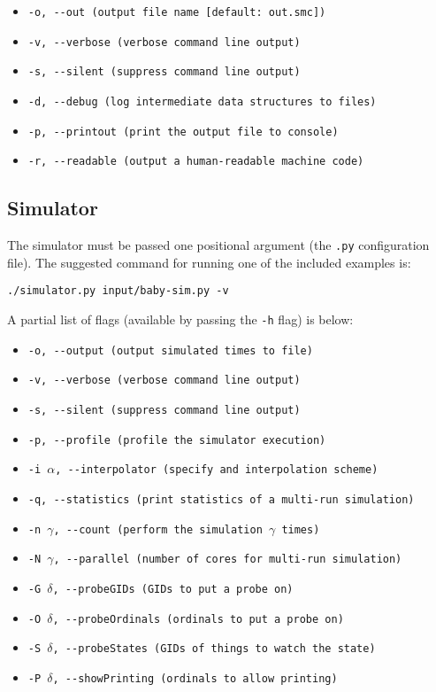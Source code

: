 \documentclass [letterpaper, 10pt, notitlepage, fleqn, oneside, 
  landscape] {article}
\begin{document}
\begin{multicols}{2}
  \begin{itemize}
  \item \texttt{-o, -{}-out (output file name [default: out.smc])}
  \item \texttt{-v, -{}-verbose (verbose command line output)}
  \item \texttt{-s, -{}-silent (suppress command line output)}
  \item \texttt{-d, -{}-debug (log intermediate data structures to files)}
  \item \texttt{-p, -{}-printout (print the output file to console)}
  \item \texttt{-r, -{}-readable (output a human-readable machine code)}
  \end{itemize}

  \subsection{Simulator}

  The simulator must be passed one positional argument (the
  \texttt{.py} configuration file). The suggested command for running one
  of the included examples is:

  \texttt{\quad ./simulator.py input/baby-sim.py -v}

  A partial list of flags (available by passing the \texttt{-h} flag) is below:

  \begin{itemize}
  \item \texttt{-o, -{}-output (output simulated times to file)}
  \item \texttt{-v, -{}-verbose (verbose command line output)}
  \item \texttt{-s, -{}-silent (suppress command line output)}
  \item \texttt{-p, -{}-profile (profile the simulator execution)}
  \item \texttt{-i $\alpha$, -{}-interpolator (specify and interpolation scheme) }
  \item \texttt{-q, -{}-statistics (print statistics of a multi-run simulation) }
  \item \texttt{-n $\gamma$, -{}-count (perform the simulation $\gamma$ times) }
  \item \texttt{-N $\gamma$, -{}-parallel (number of cores for multi-run simulation) }

  \item \texttt{-G $\delta$, -{}-probeGIDs (GIDs to put a probe on) }
  \item \texttt{-O $\delta$, -{}-probeOrdinals (ordinals to put a probe on) }
  \item \texttt{-S $\delta$, -{}-probeStates (GIDs of things to watch the state) }
  \item \texttt{-P $\delta$, -{}-showPrinting (ordinals to allow printing) }
  \end{itemize}


\end{multicols}
\end{document}
